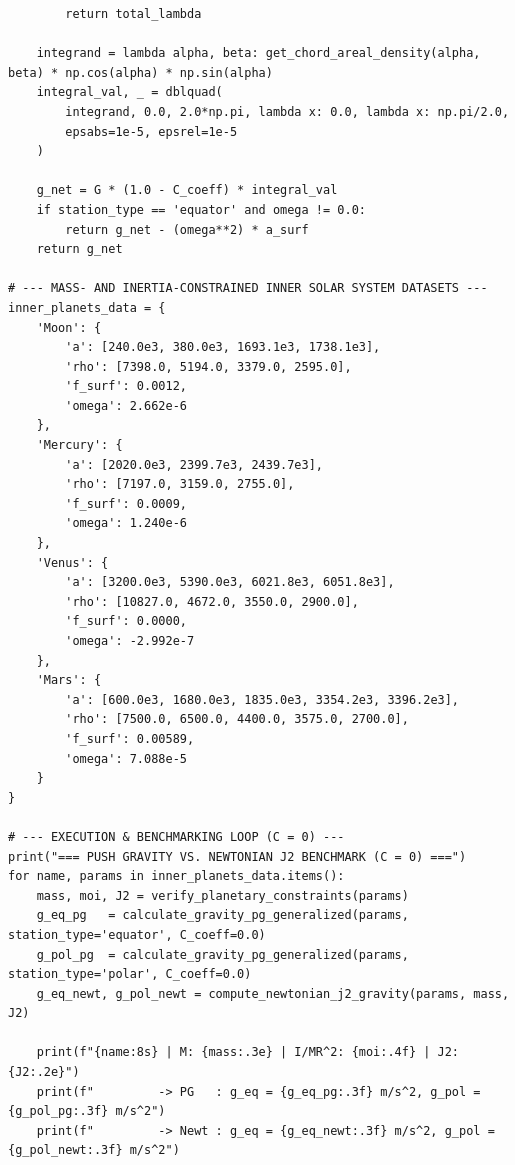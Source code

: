\begin{lstlisting}
        return total_lambda

    integrand = lambda alpha, beta: get_chord_areal_density(alpha, beta) * np.cos(alpha) * np.sin(alpha)
    integral_val, _ = dblquad(
        integrand, 0.0, 2.0*np.pi, lambda x: 0.0, lambda x: np.pi/2.0,
        epsabs=1e-5, epsrel=1e-5
    )
    
    g_net = G * (1.0 - C_coeff) * integral_val
    if station_type == 'equator' and omega != 0.0:
        return g_net - (omega**2) * a_surf
    return g_net

# --- MASS- AND INERTIA-CONSTRAINED INNER SOLAR SYSTEM DATASETS ---
inner_planets_data = {
    'Moon': {
        'a': [240.0e3, 380.0e3, 1693.1e3, 1738.1e3],
        'rho': [7398.0, 5194.0, 3379.0, 2595.0],
        'f_surf': 0.0012,
        'omega': 2.662e-6
    },
    'Mercury': {
        'a': [2020.0e3, 2399.7e3, 2439.7e3],
        'rho': [7197.0, 3159.0, 2755.0],
        'f_surf': 0.0009,
        'omega': 1.240e-6
    },
    'Venus': {
        'a': [3200.0e3, 5390.0e3, 6021.8e3, 6051.8e3],
        'rho': [10827.0, 4672.0, 3550.0, 2900.0],
        'f_surf': 0.0000,
        'omega': -2.992e-7
    },
    'Mars': {
        'a': [600.0e3, 1680.0e3, 1835.0e3, 3354.2e3, 3396.2e3],
        'rho': [7500.0, 6500.0, 4400.0, 3575.0, 2700.0],
        'f_surf': 0.00589,
        'omega': 7.088e-5
    }
}

# --- EXECUTION & BENCHMARKING LOOP (C = 0) ---
print("=== PUSH GRAVITY VS. NEWTONIAN J2 BENCHMARK (C = 0) ===")
for name, params in inner_planets_data.items():
    mass, moi, J2 = verify_planetary_constraints(params)
    g_eq_pg   = calculate_gravity_pg_generalized(params, station_type='equator', C_coeff=0.0)
    g_pol_pg  = calculate_gravity_pg_generalized(params, station_type='polar', C_coeff=0.0)
    g_eq_newt, g_pol_newt = compute_newtonian_j2_gravity(params, mass, J2)
    
    print(f"{name:8s} | M: {mass:.3e} | I/MR^2: {moi:.4f} | J2: {J2:.2e}")
    print(f"         -> PG   : g_eq = {g_eq_pg:.3f} m/s^2, g_pol = {g_pol_pg:.3f} m/s^2")
    print(f"         -> Newt : g_eq = {g_eq_newt:.3f} m/s^2, g_pol = {g_pol_newt:.3f} m/s^2")
\end{lstlisting}
%
